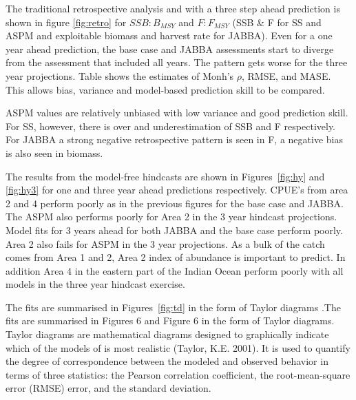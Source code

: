 \documentclass[a4paper]{article}
\begin{document}
The traditional retrospective analysis and with a three step ahead prediction is shown in figure \ref{fig:retro} for $SSB:B_{MSY}$ and $F:F_{MSY}$ (SSB & F for SS and ASPM and exploitable biomass and harvest rate for JABBA). Even for a one year ahead prediction, the base case and JABBA assessments start to diverge from the assessment that included all years. The pattern gets worse for the three year projections. Table  shows the estimates of Monh's $\rho$, RMSE, and MASE. This allows bias, variance and model-based prediction skill to be compared.

ASPM values are relatively unbiased with low variance and good prediction skill. For SS, however, there is over and underestimation of SSB and F respectively. For JABBA a strong negative retrospective pattern is seen in F, a negative bias is also seen in biomass.


The results from the model-free hindcasts are shown in Figures~\ref{fig:hy} and \ref{fig:hy3} for one and three year ahead predictions respectively. CPUE's from area 2 and 4 perform poorly as in the previous figures for the base case and JABBA. The ASPM also performs poorly for Area 2 in the 3 year hindcast projections. Model fits for 3 years ahead for both JABBA and the base case perform poorly. Area 2 also fails for ASPM in the 3 year projections. As a bulk of the catch comes from Area 1 and 2, Area 2 index of abundance is important to predict. In addition Area 4 in the eastern part of the Indian Ocean perform poorly with all models in the three year hindcast exercise.   

The fits are summarised in Figures~\ref{fig:td} in the form of Taylor diagrams \citep{taylor2001summarizing}.The fits are summarised in Figures 6 and Figure 6 in the form of Taylor diagrams. Taylor diagrams are mathematical diagrams designed to graphically indicate which of the models of is most realistic (Taylor, K.E. 2001). It is used to quantify the degree of correspondence between the modeled and observed behavior in terms of three statistics: the Pearson correlation
coefficient, the root-mean-square error (RMSE) error, and the standard deviation. 
\end{document}
